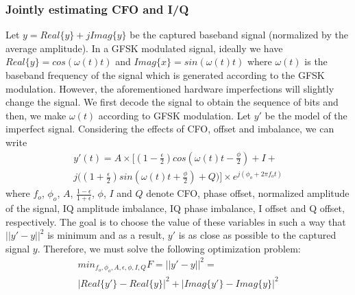 \subsubsection{Jointly estimating CFO and I/Q}

Let $y = Real\{y\}+jImag\{y\}$ be the captured baseband signal (normalized by the average amplitude). In a GFSK modulated signal, ideally we have $Real\{y\} = cos(\omega(t)t)$ and $Imag\{x\} = sin(\omega(t)t)$ where $\omega(t)$ is the baseband frequency of the signal which is generated according to the GFSK modulation. However, the aforementioned hardware imperfections will slightly change the signal. We first decode the signal to obtain the sequence of bits and then, we make $\omega(t)$ according to GFSK modulation. Let $y'$ be the model of the imperfect signal. Considering the effects of CFO, \iq offset and \iq imbalance, we can write
\begin{gather*}
    y'(t) = A \times \big[(1-\frac{\epsilon}{2})cos(\omega(t)t-\frac{\phi}{2})+I+ \\
    j\big((1+\frac{\epsilon}{2})sin(\omega(t)t+\frac{\phi}{2})+Q\big)\big] \times e^{j(\phi_o+2\pi f_o t)}
\end{gather*}
where $f_o$, $\phi_o$, $A$, $\frac{1-\epsilon}{1+\epsilon}$, $\phi$, $I$ and $Q$ denote CFO, phase offset, normalized amplitude of the signal, IQ amplitude imbalance, IQ phase imbalance, I offset and Q offset, respectively. The goal is to choose the value of these variables in such a way that $||y'-y||^2$ is minimum and as a result, $y'$ is as close as possible to the captured signal $y$. Therefore, we must solve the following optimization problem:
\begin{gather*}
    min_{f_o,\phi_o,A,\epsilon,\phi,I,Q}{F=||y'-y||^2 =} \\ |Real\{y'\}-Real\{y\}|^2+|Imag\{y'\}-Imag\{y\}|^2
\end{gather*}

